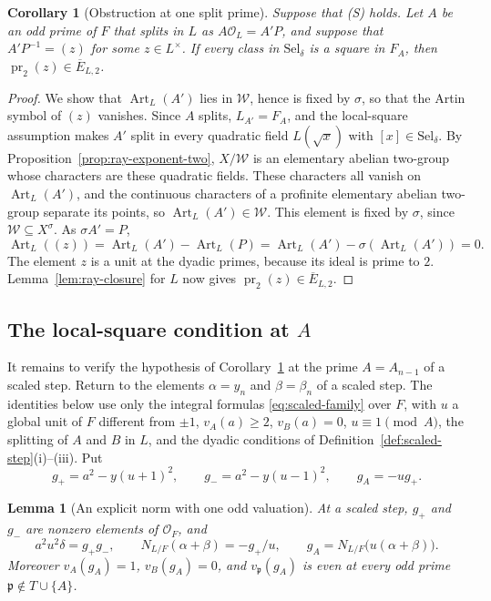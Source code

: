 \documentclass[11pt]{article}
\theoremstyle{plain}
\newtheorem{lemma}[theorem]{Lemma}
\newtheorem{corollary}[theorem]{Corollary}
\theoremstyle{definition}
\theoremstyle{remark}
\newcommand{\OO}{\mathcal O}
\begin{document}
\begin{corollary}[Obstruction at one split prime]\label{cor:active-ray}
Suppose that \textup{(S)} holds.  Let $A$ be an odd prime of $F$ that
splits in $L$ as $A\OO_L=A'P$, and suppose that $A'P^{-1}=(z)$ for some
$z\in L^\times$.  If every class in $\mathrm{Sel}_\delta$ is a square in
$F_A$, then $\operatorname{pr}_2(z)\in\overline E_{L,2}$.
\end{corollary}

\begin{proof}
We show that $\operatorname{Art}_L(A')$ lies in $\mathcal W$, hence is
fixed by $\sigma$, so that the Artin symbol of $(z)$ vanishes.  Since $A$
splits, $L_{A'}=F_A$, and the local-square assumption makes $A'$ split in
every quadratic field $L(\sqrt x)$ with $[x]\in\mathrm{Sel}_\delta$.  By
Proposition~\ref{prop:ray-exponent-two}, $X/\mathcal W$ is an elementary
abelian two-group whose characters are these quadratic fields.  These
characters all vanish on $\operatorname{Art}_L(A')$, and the continuous
characters of a profinite elementary abelian two-group separate its
points, so $\operatorname{Art}_L(A')\in\mathcal W$.  This element is fixed by
$\sigma$, since $\mathcal W\subseteq X^\sigma$.  As $\sigma A'=P$,
\[
 \operatorname{Art}_L((z))=
 \operatorname{Art}_L(A')-\operatorname{Art}_L(P)
 =\operatorname{Art}_L(A')-\sigma(\operatorname{Art}_L(A'))=0.
\]
The element $z$ is a unit at the dyadic primes, because its ideal is
prime to $2$.  Lemma~\ref{lem:ray-closure} for $L$ now gives
$\operatorname{pr}_2(z)\in\overline E_{L,2}$.
\end{proof}

\subsection{The local-square condition at \texorpdfstring{$A$}{A}}\label{sec:dyadic-A}

It remains to verify the hypothesis of Corollary~\ref{cor:active-ray} at
the prime $A=A_{n-1}$ of a scaled step.  Return to the elements
$\alpha=y_n$ and $\beta=\beta_n$ of a scaled step.  The identities below
use only the integral formulas \eqref{eq:scaled-family} over $F$, with
$u$ a global unit of $F$ different from $\pm1$, $v_A(a)\ge2$,
$v_B(a)=0$, $u\equiv1\pmod A$, the splitting of $A$ and $B$ in $L$, and
the dyadic conditions of Definition~\ref{def:scaled-step}(i)--(iii).  Put
\[
 g_+=a^2-y(u+1)^2,\qquad g_-=a^2-y(u-1)^2,
 \qquad g_A=-u g_+.
\]

\begin{lemma}[An explicit norm with one odd valuation]\label{lem:gA}
At a scaled step, $g_+$ and $g_-$ are nonzero elements of $\OO_F$, and
\begin{equation}\label{eq:active-norm}
 a^2u^2\delta=g_+g_-,\qquad
 N_{L/F}(\alpha+\beta)=-g_+/u,\qquad
 g_A=N_{L/F}\bigl(u(\alpha+\beta)\bigr).
\end{equation}
Moreover $v_A(g_A)=1$, $v_B(g_A)=0$, and $v_{\mathfrak p}(g_A)$ is even
at every odd prime $\mathfrak p\notin T\cup\{A\}$.
\end{lemma}
\end{document}
